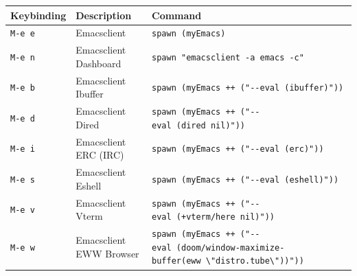 \begin{longtable}[]{@{}
  >{\raggedright\arraybackslash}p{}
  >{\raggedright\arraybackslash}p{}
  >{\raggedright\arraybackslash}p{}@{}}
\toprule
Keybinding & Description & Command \\
\midrule
\endhead
\texttt{M-e\ e} & Emacsclient & \texttt{spawn\ (myEmacs)} \\
\texttt{M-e\ n} & Emacsclient Dashboard &
\texttt{spawn\ "emacsclient\ -a\ emacs\ -c"} \\
\texttt{M-e\ b} & Emacsclient Ibuffer &
\texttt{spawn\ (myEmacs\ ++\ ("-\/-eval\ \textquotesingle{}(ibuffer)\textquotesingle{}"))} \\
\texttt{M-e\ d} & Emacsclient Dired &
\texttt{spawn\ (myEmacs\ ++\ ("-\/-eval\ \textquotesingle{}(dired\ nil)\textquotesingle{}"))} \\
\texttt{M-e\ i} & Emacsclient ERC (IRC) &
\texttt{spawn\ (myEmacs\ ++\ ("-\/-eval\ \textquotesingle{}(erc)\textquotesingle{}"))} \\
\texttt{M-e\ s} & Emacsclient Eshell &
\texttt{spawn\ (myEmacs\ ++\ ("-\/-eval\ \textquotesingle{}(eshell)\textquotesingle{}"))} \\
\texttt{M-e\ v} & Emacsclient Vterm &
\texttt{spawn\ (myEmacs\ ++\ ("-\/-eval\ \textquotesingle{}(+vterm/here\ nil)\textquotesingle{}"))} \\
\texttt{M-e\ w} & Emacsclient EWW Browser &
\texttt{spawn\ (myEmacs\ ++\ ("-\/-eval\ \textquotesingle{}(doom/window-maximize-buffer(eww\ \textbackslash{}"distro.tube\textbackslash{}"))\textquotesingle{}"))} \\
\bottomrule
\end{longtable}
